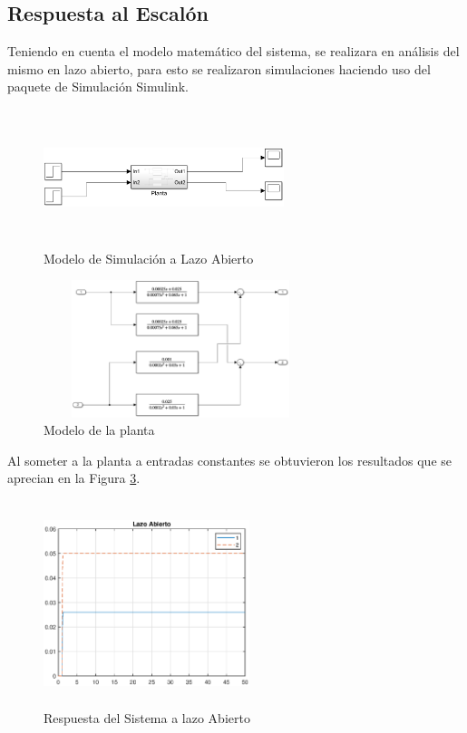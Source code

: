 \documentclass[journal,twoside,web]{ieeecolor}
\begin{document}
		
	\subsection{Respuesta al Escalón}
	
	Teniendo en cuenta el modelo matemático del sistema, se realizara en análisis del mismo en lazo abierto, para esto se realizaron simulaciones haciendo uso 
	del paquete de Simulación Simulink.
	
	\begin{figure}[h]
		\begin{center}
			\includegraphics[width=7cm,height=4cm,keepaspectratio]{modelsimulink}
			\caption{Modelo de Simulación a Lazo Abierto\label{modelsimulink}}
		\end{center}
	\end{figure}
	
	
	\begin{figure}[h]
		\begin{center}
			\includegraphics[width=8cm,height=4cm,keepaspectratio]{subsystemtf}
			\caption{Modelo de la planta \label{subsystemtf}}
		\end{center}
	\end{figure}	
	
	Al someter a la planta a entradas constantes se obtuvieron los resultados que se aprecian en la Figura \ref{olstepresponse}.
	
	\begin{figure}[h]
		\begin{center}
			\includegraphics[width=6cm,height=6cm,keepaspectratio]{olstepresponse}
			\caption{ Respuesta del Sistema a lazo Abierto \label{olstepresponse}}
		\end{center}
	\end{figure}		
	
\end{document}

